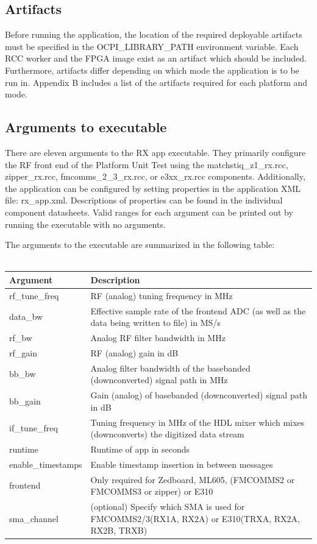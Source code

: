 \subsection{Artifacts}
\noindent Before running the application, the location of the required deployable artifacts must be specified in the OCPI\_LIBRARY\_PATH environment variable. Each RCC worker and the FPGA image exist as an artifact which should be included. Furthermore, artifacts differ depending on which mode the application is to be run in. Appendix B includes a list of the artifacts required for each platform and mode.
\newpage
\subsection{Arguments to executable}
\noindent There are eleven arguments to the RX app executable. They primarily configure the RF front end of the Platform Unit Test using the matchstiq\_z1\_rx.rcc, zipper\_rx.rcc, fmcomms\_2\_3\_rx.rcc, or e3xx\_rx.rcc components. Additionally, the application can be configured by setting properties in the application XML file: rx\_app.xml. Descriptions of properties can be found in the individual component datasheets. Valid ranges for each argument can be printed out by running the executable with no arguments.\par\medskip 

\noindent The arguments to the executable are summarized in the following table: \\ \\
	\begin{tabular}{|l|p{400pt}|}
	\hline
	\rowcolor{blue}
	Argument & Description\\
	\hline
	rf\_tune\_freq & RF (analog) tuning frequency in MHz\\
	\hline
	data\_bw & Effective sample rate of the frontend ADC (as well as the data being written to file) in MS/s\\
	\hline
	rf\_bw & Analog RF filter bandwidth in MHz\\
	\hline
	rf\_gain & RF (analog) gain in dB\\
	\hline
	bb\_bw & Analog filter bandwidth of the basebanded (downconverted) signal path in MHz\\
	\hline
	bb\_gain & Gain (analog) of basebanded (downconverted) signal path in dB\\
	\hline
	if\_tune\_freq & Tuning frequency in MHz of the HDL mixer which mixes (downconverts) the digitized data stream\\
	\hline
	runtime & Runtime of app in seconds\\
	\hline
	enable\_timestamps & Enable timestamp insertion in between messages\\
	\hline
	frontend     & Only required for Zedboard, ML605, (FMCOMMS2 or FMCOMMS3 or zipper) or E310\\
	\hline
	sma\_channel & (optional) Specify which SMA is used for FMCOMMS2/3(RX1A, RX2A) or
	E310(TRXA, RX2A, RX2B, TRXB) \\
	\hline
	\end{tabular}
